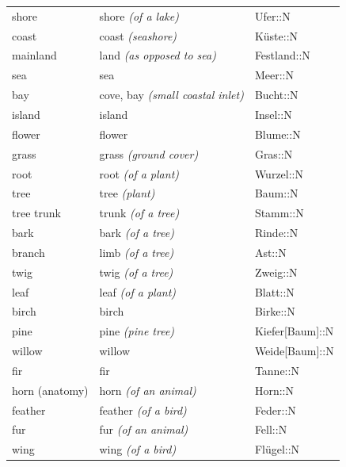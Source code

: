 \begin{center}
\begin{longtable}{lll}
{\sc \lowercase{	SHORE	}}	&	shore	\textit{\footnotesize (of a lake)}	&	Ufer::N	\\
{\sc \lowercase{	COAST	}}	&	coast	\textit{\footnotesize (seashore)}	&	Küste::N	\\
{\sc \lowercase{	MAINLAND	}}	&	land	\textit{\footnotesize (as opposed to sea)}	&	Festland::N	\\
{\sc \lowercase{	SEA	}}	&	sea		&	Meer::N	\\
{\sc \lowercase{	BAY	}}	&	cove, bay	\textit{\footnotesize (small coastal inlet)}	&	Bucht::N	\\
{\sc \lowercase{	ISLAND	}}	&	island		&	Insel::N	\\
{\sc \lowercase{	FLOWER	}}	&	flower		&	Blume::N	\\
{\sc \lowercase{	GRASS	}}	&	grass	\textit{\footnotesize (ground cover)}	&	Gras::N	\\
{\sc \lowercase{	ROOT	}}	&	root	\textit{\footnotesize (of a plant)}	&	Wurzel::N	\\
{\sc \lowercase{	TREE	}}	&	tree	\textit{\footnotesize (plant)}	&	Baum::N	\\
{\sc \lowercase{	TREE TRUNK	}}	&	trunk	\textit{\footnotesize (of a tree)}	&	Stamm::N	\\
{\sc \lowercase{	BARK	}}	&	bark	\textit{\footnotesize (of a tree)}	&	Rinde::N	\\
{\sc \lowercase{	BRANCH	}}	&	limb	\textit{\footnotesize (of a tree)}	&	Ast::N	\\
{\sc \lowercase{	TWIG	}}	&	twig	\textit{\footnotesize (of a tree)}	&	Zweig::N	\\
{\sc \lowercase{	LEAF	}}	&	leaf	\textit{\footnotesize (of a plant)}	&	Blatt::N	\\
{\sc \lowercase{	BIRCH	}}	&	birch		&	Birke::N	\\
{\sc \lowercase{	PINE	}}	&	pine	\textit{\footnotesize (pine tree)}	&	Kiefer[Baum]::N	\\
{\sc \lowercase{	WILLOW	}}	&	willow		&	Weide[Baum]::N	\\
{\sc \lowercase{	FIR	}}	&	fir		&	Tanne::N	\\
{\sc \lowercase{	HORN \footnotesize (ANATOMY)	}}	&	horn	\textit{\footnotesize (of an animal)}	&	Horn::N	\\
{\sc \lowercase{	FEATHER	}}	&	feather	\textit{\footnotesize (of a bird)}	&	Feder::N	\\
{\sc \lowercase{	FUR	}}	&	fur	\textit{\footnotesize (of an animal)}	&	Fell::N	\\
{\sc \lowercase{	WING	}}	&	wing	\textit{\footnotesize (of a bird)}	&	Flügel::N	\\

\end{longtable}
\end{center}
